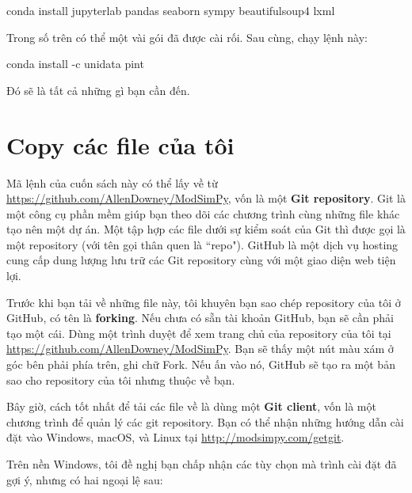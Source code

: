 \documentclass[12pt, openany]{book}
\theoremstyle{exercise}
\newcommand{\py}{\verb}%}
\begin{document}
\begin{code}
conda install jupyterlab pandas seaborn sympy beautifulsoup4 lxml
\end{code}

Trong số trên có thể một vài gói đã được cài rối. Sau cùng, chạy lệnh này:

\begin{code}
conda install -c unidata pint
\end{code}

Đó sẽ là tất cả những gì bạn cần đến.


\section{Copy các file của tôi}

Mã lệnh của cuốn sách này có thể lấy về từ 
\url{https://github.com/AllenDowney/ModSimPy}, vốn là một {\bf Git repository}.  Git là một công cụ phần mềm giúp bạn theo dõi các chương trình cùng những file khác tạo nên một dự án. Một tập hợp các file dưới sự kiểm soát của Git thì được gọi là một repository (với tên gọi thân quen là ``repo").  GitHub là một dịch vụ hosting cung cấp dung lượng lưu trữ các Git repository cùng với một giao diện web tiện lợi.


Trước khi bạn tải về những file này, tôi khuyên bạn sao chép repository của tôi ở GitHub, có tên là {\bf forking}.  Nếu chưa có sẵn tài khoản GitHub, bạn sẽ cần phải tạo một cái.  
Dùng một trình duyệt để xem trang chủ của repository của tôi tại \url{https://github.com/AllenDowney/ModSimPy}.   Bạn sẽ thấy một nút màu xám ở góc bên phải phía trên, ghi chữ {\sf Fork}.  Nếu ấn vào nó, GitHub sẽ tạo ra một bản sao cho repository của tôi nhưng thuộc về bạn.

Bây giờ, cách tốt nhất để tải các file về là dùng một {\bf Git client}, vốn là một chương trình để quản lý các git repository.  Bạn có thể nhận những hướng dẫn cài đặt vào Windows, macOS, và Linux tại \url{http://modsimpy.com/getgit}. 

Trên nền Windows, tôi đề nghị bạn chấp nhận các tùy chọn mà trình cài đặt đã gợi ý, nhưng có hai ngoại lệ sau:

\end{document}
